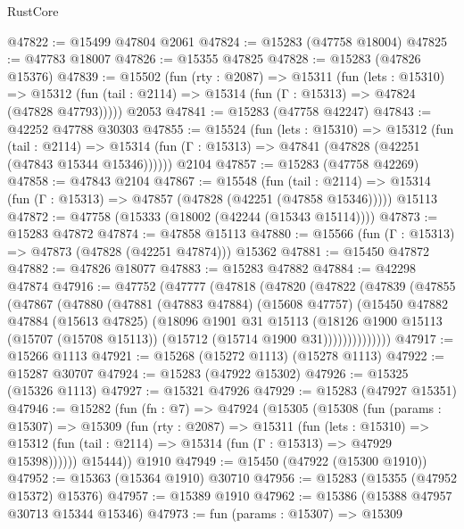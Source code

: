 \begin{lexlean}{RustCore}
\begin{coremodule}
@47822 := @15499 @47804 @2061
@47824 := @15283 (@47758 @18004)
@47825 := @47783 @18007
@47826 := @15355 @47825
@47828 := @15283 (@47826 @15376)
@47839 := @15502
    (fun (rty : @2087) =>
    @15311
      (fun (lets : @15310) =>
      @15312 (fun (tail : @2114) => @15314 (fun (Γ : @15313) => @47824 (@47828 @47793)))))
    @2053
@47841 := @15283 (@47758 @42247)
@47843 := @42252 @47788 @30303
@47855 := @15524
    (fun (lets : @15310) =>
    @15312
      (fun (tail : @2114) =>
      @15314 (fun (Γ : @15313) => @47841 (@47828 (@42251 (@47843 @15344 @15346))))))
    @2104
@47857 := @15283 (@47758 @42269)
@47858 := @47843 @2104
@47867 := @15548
    (fun (tail : @2114) => @15314 (fun (Γ : @15313) => @47857 (@47828 (@42251 (@47858 @15346)))))
    @15113
@47872 := @47758 (@15333 (@18002 (@42244 (@15343 @15114))))
@47873 := @15283 @47872
@47874 := @47858 @15113
@47880 := @15566 (fun (Γ : @15313) => @47873 (@47828 (@42251 @47874))) @15362
@47881 := @15450 @47872
@47882 := @47826 @18077
@47883 := @15283 @47882
@47884 := @42298 @47874
@47916 := @47752
    (@47777
      (@47818
        (@47820
          (@47822
            (@47839
              (@47855
                (@47867
                  (@47880
                    (@47881
                      (@47883 @47884)
                      (@15608 @47757)
                      (@15450
                        @47882
                        @47884
                        (@15613 @47825)
                        (@18096
                          @1901
                          @31
                          @15113
                          (@18126
                            @1900
                            @15113
                            (@15707 (@15708 @15113))
                            (@15712 (@15714 @1900 @31))))))))))))))
@47917 := @15266 @1113
@47921 := @15268 (@15272 @1113) (@15278 @1113)
@47922 := @15287 @30707
@47924 := @15283 (@47922 @15302)
@47926 := @15325 (@15326 @1113)
@47927 := @15321 @47926
@47929 := @15283 (@47927 @15351)
@47946 := @15282
    (fun (fn : @7) =>
    @47924
      (@15305
        (@15308
          (fun (params : @15307) =>
          @15309
            (fun (rty : @2087) =>
            @15311
              (fun (lets : @15310) =>
              @15312 (fun (tail : @2114) => @15314 (fun (Γ : @15313) => @47929 @15398))))))
        @15444))
    @1910
@47949 := @15450 (@47922 (@15300 @1910))
@47952 := @15363 (@15364 @1910) @30710
@47956 := @15283 (@15355 (@47952 @15372) @15376)
@47957 := @15389 @1910
@47962 := @15386 (@15388 @47957 @30713 @15344 @15346)
@47973 := fun (params : @15307) =>
  @15309

\end{coremodule}
\end{lexlean}
